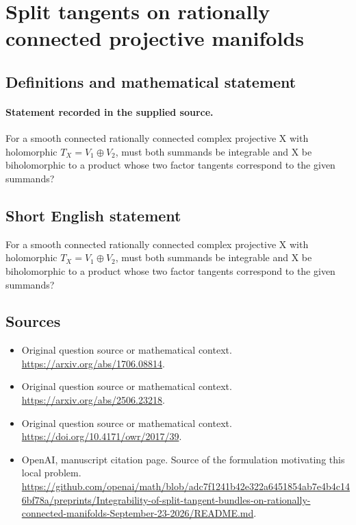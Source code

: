 \documentclass[11pt]{article}
\begin{document}
\section*{Split tangents on rationally connected projective manifolds}\label{30007059}
\subsection{Definitions and mathematical statement}
\paragraph{Statement recorded in the supplied source.}
For a smooth connected rationally connected complex projective X with holomorphic $T_X=V_{1}\oplus V_{2}$, must both summands be integrable and X be biholomorphic to a product whose two factor tangents correspond to the given summands?
\subsection{Short English statement}
For a smooth connected rationally connected complex projective X with holomorphic $T_X=V_{1}\oplus V_{2}$, must both summands be integrable and X be biholomorphic to a product whose two factor tangents correspond to the given summands?
\subsection{Sources}
\begin{itemize}
\item[S1] Original question source or mathematical context.
\url{https://arxiv.org/abs/1706.08814}.
\item[S2] Original question source or mathematical context.
\url{https://arxiv.org/abs/2506.23218}.
\item[S3] Original question source or mathematical context.
\url{https://doi.org/10.4171/owr/2017/39}.
\item[S4] OpenAI, manuscript citation page. Source of the formulation motivating this local problem.
\url{https://github.com/openai/math/blob/adc7f1241b42e322a6451854ab7e4b4c146bf78a/preprints/Integrability-of-split-tangent-bundles-on-rationally-connected-manifolds-September-23-2026/README.md}.
\end{itemize}
\end{document}
